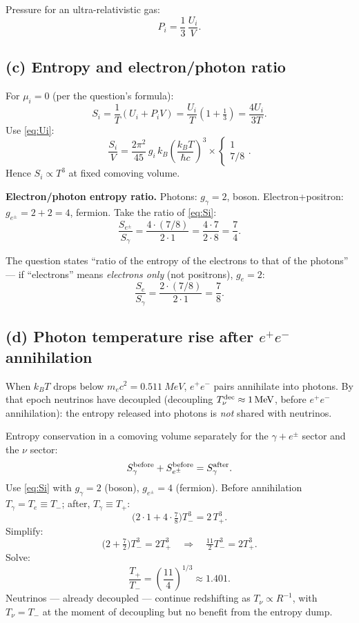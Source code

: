\documentclass[11pt]{article}
\begin{document}
Pressure for an ultra-relativistic gas:
\[
\boxed{\;P_i = \frac{1}{3}\,\frac{U_i}{V}.\;}
\label{eq:Pi}
\]

\subsection*{(c) Entropy and electron/photon ratio}

For $\mu_i=0$ (per the question's formula):
\[
S_i = \frac{1}{T}(U_i + P_i V) = \frac{U_i}{T}\left(1 + \tfrac13\right) = \frac{4 U_i}{3 T}.
\]
Use \eqref{eq:Ui}:
\[
\boxed{\;\frac{S_i}{V} = \frac{2\pi^2}{45}\,g_i\,k_B\left(\frac{k_B T}{\hbar c}\right)^3\times\begin{cases}1\\ 7/8\end{cases}.\;}
\label{eq:Si}
\]
Hence $S_i\propto T^3$ at fixed comoving volume.

\textbf{Electron/photon entropy ratio.} Photons: $g_\gamma = 2$, boson. Electron+positron: $g_{e^\pm} = 2 + 2 = 4$, fermion. Take the ratio of \eqref{eq:Si}:
\[
\frac{S_{e^\pm}}{S_\gamma} = \frac{4\cdot(7/8)}{2\cdot 1} = \frac{4\cdot 7}{2\cdot 8} = \frac{7}{4}.
\]

The question states ``ratio of the entropy of the electrons to that of the photons'' --- if ``electrons'' means \emph{electrons only} (not positrons), $g_e = 2$:
\[
\boxed{\;\frac{S_e}{S_\gamma} = \frac{2\cdot (7/8)}{2\cdot 1} = \frac{7}{8}.\;}
\label{eq:Sratio}
\]

\subsection*{(d) Photon temperature rise after $e^+e^-$ annihilation}

When $k_B T$ drops below $m_e c^2 = \SI{0.511}{MeV}$, $e^+e^-$ pairs annihilate into photons. By that epoch neutrinos have decoupled (decoupling $T_\nu^{\rm dec}\approx\SI{1}{MeV}$, before $e^+e^-$ annihilation): the entropy released into photons is \emph{not} shared with neutrinos.

Entropy conservation in a comoving volume separately for the $\gamma + e^\pm$ sector and the $\nu$ sector:
\[
S_\gamma^{\rm before} + S_{e^\pm}^{\rm before} = S_\gamma^{\rm after}.
\]
Use \eqref{eq:Si} with $g_\gamma=2$ (boson), $g_{e^\pm}=4$ (fermion). Before annihilation $T_\gamma=T_e \equiv T_-$; after, $T_\gamma\equiv T_+$:
\[
\bigl(2\cdot 1 + 4\cdot \tfrac78\bigr)T_-^3 = 2\,T_+^3.
\]
Simplify:
\[
\bigl(2 + \tfrac{7}{2}\bigr)T_-^3 = 2 T_+^3\quad\Longrightarrow\quad \tfrac{11}{2}T_-^3 = 2 T_+^3.
\]
Solve:
\[
\boxed{\;\frac{T_+}{T_-} = \left(\frac{11}{4}\right)^{1/3}\approx 1.401.\;}
\label{eq:reheat}
\]
Neutrinos --- already decoupled --- continue redshifting as $T_\nu\propto R^{-1}$, with $T_\nu = T_-$ at the moment of decoupling but no benefit from the entropy dump.
\end{document}
